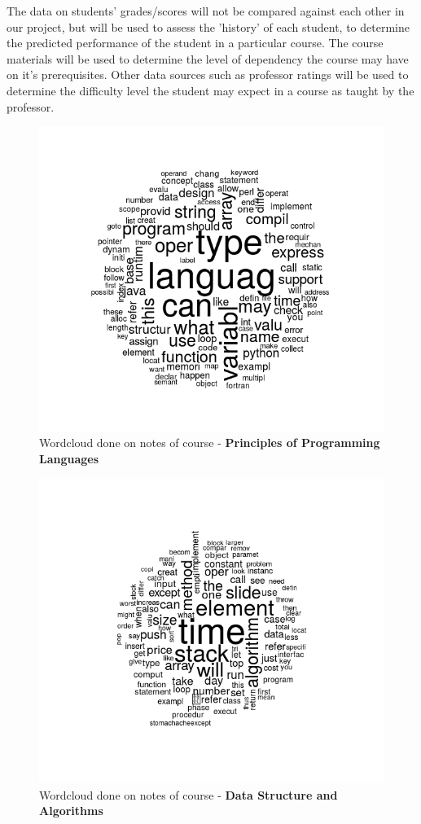 \documentclass[conference]{IEEEtran}
\begin{document}
The data on students' grades/scores will not be compared against each other in our project, but will be used to assess the 'history' of each student, to determine the predicted performance of the student in a particular course. The course materials will be used to determine the level of dependency the course may have on it's prerequisites. Other data sources such as professor ratings will be used to determine the difficulty level the student may expect in a course as taught by the
professor.
\begin{figure}
	\includegraphics[width=\linewidth]{ppl.png}
	\caption{Wordcloud done on notes of course - \textbf{Principles of Programming Languages}}
	\label{fig:ppl}
\end{figure}
\begin{figure}
	\includegraphics[width=\linewidth]{ds.png}
	\caption{Wordcloud done on notes of course -\textbf{ Data Structure and Algorithms} }
	\label{fig:ds}
\end{figure}
\end{document}
